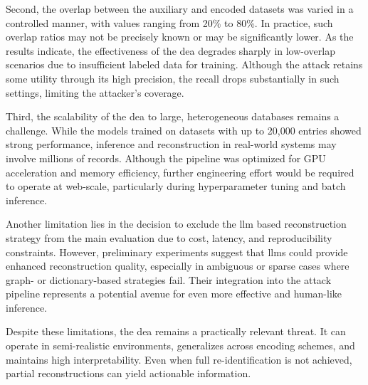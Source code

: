 Second, the overlap between the auxiliary and encoded datasets was varied in a controlled manner, with values ranging from 20\% to 80\%.
In practice, such overlap ratios may not be precisely known or may be significantly lower.
As the results indicate, the effectiveness of the \ac{dea} degrades sharply in low-overlap scenarios due to insufficient labeled data for training.
Although the attack retains some utility through its high precision, the recall drops substantially in such settings, limiting the attacker's coverage.

Third, the scalability of the \ac{dea} to large, heterogeneous databases remains a challenge.
While the models trained on datasets with up to 20{,}000 entries showed strong performance, inference and reconstruction in real-world systems may involve millions of records.
Although the pipeline was optimized for GPU acceleration and memory efficiency, further engineering effort would be required to operate at web-scale, particularly during hyperparameter tuning and batch inference.

Another limitation lies in the decision to exclude the \ac{llm} based reconstruction strategy from the main evaluation due to cost, latency, and reproducibility constraints.
However, preliminary experiments suggest that \ac{llm}s could provide enhanced reconstruction quality, especially in ambiguous or sparse cases where graph- or dictionary-based strategies fail.
Their integration into the attack pipeline represents a potential avenue for even more effective and human-like inference.

Despite these limitations, the \ac{dea} remains a practically relevant threat.
It can operate in semi-realistic environments, generalizes across encoding schemes, and maintains high interpretability.
Even when full re-identification is not achieved, partial reconstructions can yield actionable information.